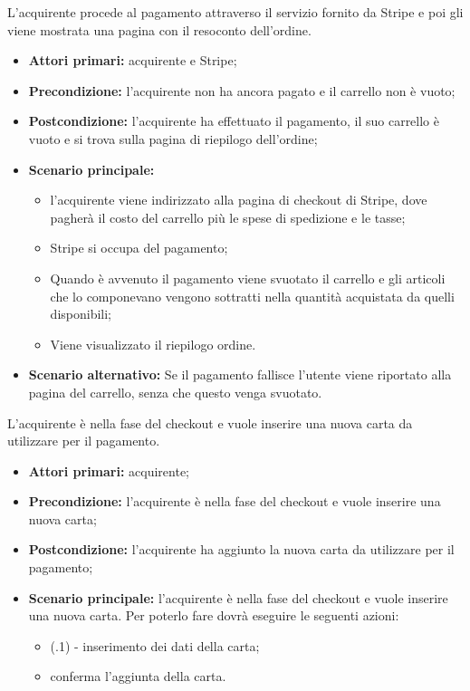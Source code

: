 \resetSubUC

L'acquirente procede al pagamento attraverso il servizio fornito da Stripe e poi gli viene mostrata una pagina con il resoconto dell'ordine.
\begin{itemize}
    \item \textbf{Attori primari:} acquirente e Stripe;
    \item \textbf{Precondizione:} l'acquirente non ha ancora pagato e il carrello non è vuoto;
    \item \textbf{Postcondizione:} l'acquirente ha effettuato il pagamento, il suo carrello è vuoto e si trova sulla pagina di riepilogo dell'ordine;
    \item \textbf{Scenario principale:}
        \begin{itemize}
            \item l'acquirente viene indirizzato alla pagina di checkout di Stripe, dove pagherà il costo del carrello più le spese di spedizione e le tasse;
            \item Stripe si occupa del pagamento;
            \item Quando è avvenuto il pagamento viene svuotato il carrello e gli articoli che lo componevano vengono sottratti nella quantità acquistata da quelli disponibili;
            \item Viene visualizzato il riepilogo ordine.
        \end{itemize}
    \item \textbf{Scenario alternativo:} Se il pagamento fallisce l'utente viene riportato alla pagina del carrello, senza che questo venga svuotato.
\end{itemize}


L'acquirente è nella fase del checkout e vuole inserire una nuova carta da utilizzare per il pagamento.
\begin{itemize}
    \item \textbf{Attori primari:} acquirente;
    \item \textbf{Precondizione:} l'acquirente è nella fase del checkout e vuole inserire una nuova carta;
    \item \textbf{Postcondizione:} l'acquirente ha aggiunto la nuova carta da utilizzare per il pagamento;
    \item \textbf{Scenario principale:} l'acquirente è nella fase del checkout e vuole inserire una nuova carta. Per poterlo fare dovrà eseguire le seguenti azioni:
    \begin{itemize}
        \item (\actualUC.1) - inserimento dei dati della carta;
        \item conferma l'aggiunta della carta.
    \end{itemize}
\end{itemize}

